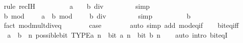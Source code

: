 \begin{isabellebody}
\ {\isacharparenleft}{\kern0pt}rule\ rec{\isachardot}{\kern0pt}IH{\isacharparenright}{\kern0pt}\isanewline
\ \ \ \ \isamarkupfalse%
\ \isamarkupfalse%
\ {\isacartoucheopen}{}\ {\isacharasterisk}{\kern0pt}\ a\ {\isacharequal}{\kern0pt}\ {}\ {\isacharasterisk}{\kern0pt}\ {\isacharparenleft}{\kern0pt}b\ div\ {}{\isacharparenright}{\kern0pt}{\isacartoucheclose}\isanewline
\ \ \ \ \ \ \isamarkupfalse%
\ simp\isanewline
\ \ \ \ \isamarkupfalse%
\ \isamarkupfalse%
\ {\isacartoucheopen}b\ mod\ {}\ {\isacharplus}{\kern0pt}\ {}\ {\isacharasterisk}{\kern0pt}\ a\ {\isacharequal}{\kern0pt}\ b\ mod\ {}\ {\isacharplus}{\kern0pt}\ {}\ {\isacharasterisk}{\kern0pt}\ {\isacharparenleft}{\kern0pt}b\ div\ {}{\isacharparenright}{\kern0pt}{\isacartoucheclose}\isanewline
\ \ \ \ \ \ \isamarkupfalse%
\ simp\isanewline
\ \ \ \ \isamarkupfalse%
\ \isamarkupfalse%
\ {\isacartoucheopen}{\isasymdots}\ {\isacharequal}{\kern0pt}\ b{\isacartoucheclose}\isanewline
\ \ \ \ \ \ \isamarkupfalse%
\ {\isacharparenleft}{\kern0pt}fact\ mod{\isacharunderscore}{\kern0pt}mult{\isacharunderscore}{\kern0pt}div{\isacharunderscore}{\kern0pt}eq{\isacharparenright}{\kern0pt}\isanewline
\ \ \ \ \isamarkupfalse%
\ \isamarkupfalse%
\ {\isacharquery}{\kern0pt}case\isanewline
\ \ \ \ \ \ \isamarkupfalse%
\ {\isacharparenleft}{\kern0pt}auto\ simp\ add{\isacharcolon}{\kern0pt}\ mod{}{\isacharunderscore}{\kern0pt}eq{\isacharunderscore}{\kern0pt}if{\isacharparenright}{\kern0pt}\isanewline
\ \ \isamarkupfalse%
\isanewline
{}\isamarkupfalse%
%
\endisatagproof
{\isafoldproof}%
%
\isadelimproof
\isanewline
%
\endisadelimproof
\isanewline
{}\isamarkupfalse%
\ bit{\isacharunderscore}{\kern0pt}eq{\isacharunderscore}{\kern0pt}iff{\isacharcolon}{\kern0pt}\isanewline
\ \ {\isacartoucheopen}a\ {\isacharequal}{\kern0pt}\ b\ {\isasymlongleftrightarrow}\ {\isacharparenleft}{\kern0pt}{\isasymforall}n{\isachardot}{\kern0pt}\ possible{\isacharunderscore}{\kern0pt}bit\ TYPE{\isacharparenleft}{\kern0pt}{\isacharprime}{\kern0pt}a{\isacharparenright}{\kern0pt}\ n\ {\isasymlongrightarrow}\ bit\ a\ n\ {\isasymlongleftrightarrow}\ bit\ b\ n{\isacharparenright}{\kern0pt}{\isacartoucheclose}\isanewline
%
\isadelimproof
\ \ %
\endisadelimproof
%
\isatagproof
{}\isamarkupfalse%
\ {\isacharparenleft}{\kern0pt}auto\ intro{\isacharcolon}{\kern0pt}\ bit{\isacharunderscore}{\kern0pt}eqI{\isacharparenright}{\kern0pt}%

\end{isabellebody}
